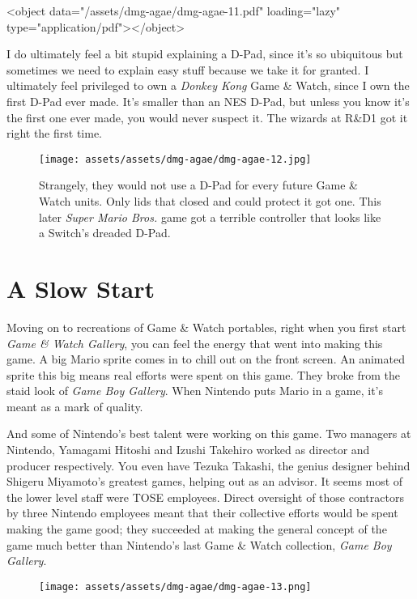 \documentclass{book}
\begin{document}
<object data="/assets/dmg-agae/dmg-agae-11.pdf" loading="lazy" type="application/pdf"></object>

I do ultimately feel a bit stupid explaining a D-Pad, since it’s so ubiquitous but sometimes we need to explain easy stuff because we take it for granted. I ultimately feel privileged to own a \emph{Donkey Kong} Game \& Watch, since I own the first D-Pad ever made. It’s smaller than an NES D-Pad, but unless you know it’s the first one ever made, you would never suspect it. The wizards at R\&D1 got it right the first time.

\begin{figure}[hbt]
\vskip 10pt
\centering \texttt{[image: assets/assets/dmg-agae/dmg-agae-12.jpg]}\par\pagetwodescription Strangely, they would not use a D-Pad for every future Game \& Watch units. Only lids that closed and could protect it got one. This later \emph{Super Mario Bros.} game got a terrible controller that looks like a Switch’s dreaded D-Pad.
\vskip 6pt
\end{figure}

\FloatBarrier\needspace{10mm}\section*{A Slow Start}\nopagebreak[4]

Moving on to recreations of Game \& Watch portables, right when you first start \emph{Game \& Watch Gallery}, you can feel the energy that went into making this game. A big Mario sprite comes in to chill out on the front screen. An animated sprite this big means real efforts were spent on this game. They broke from the staid look of \emph{Game Boy Gallery}. When Nintendo puts Mario in a game, it’s meant as a mark of quality.

And some of Nintendo’s best talent were working on this game. Two managers at Nintendo, Yamagami Hitoshi and Izushi Takehiro worked as director and producer respectively. You even have Tezuka Takashi, the genius designer behind Shigeru Miyamoto’s greatest games, helping out as an advisor. It seems most of the lower level staff were TOSE employees. Direct oversight of those contractors by three Nintendo employees meant that their collective efforts would be spent making the game good; they succeeded at making the general concept of the game much better than Nintendo’s last Game \& Watch collection, \emph{Game Boy Gallery}.

\begin{figure}[hbt]
\vskip 10pt
\centering \texttt{[image: assets/assets/dmg-agae/dmg-agae-13.png]}
\vskip 6pt
\end{figure}
\end{document}
